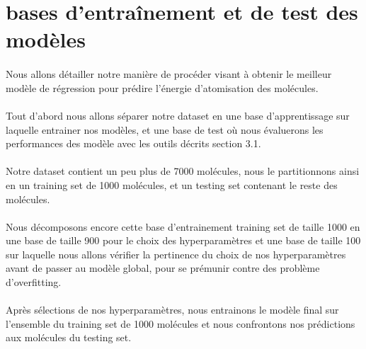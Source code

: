 \documentclass[a4paper,12pt,titlepage]{report}
\begin{document}
\section{bases d'entraînement et de test des modèles}

\paragraph{}
Nous allons détailler notre manière de procéder visant à obtenir le meilleur modèle de régression pour prédire l'énergie d'atomisation des molécules.

\paragraph{}
Tout d'abord nous allons séparer notre dataset en une base d'apprentissage sur laquelle entrainer nos modèles, et une base de test où nous évaluerons les performances des modèle avec les outils décrits section 3.1. 
\paragraph{}
Notre dataset contient un peu plus de 7000 molécules, nous le partitionnons ainsi en un training set de 1000 molécules, et un testing set contenant le reste des molécules.
\paragraph{}
Nous décomposons encore cette base d'entrainement training set de taille 1000 en une base de taille 900 pour le choix des hyperparamètres et une base de taille 100 sur laquelle nous allons vérifier la pertinence du choix de nos hyperparamètres avant de passer au modèle global, pour se prémunir contre des problème d'overfitting.
\paragraph{}
Après sélections de nos hyperparamètres, nous entrainons le modèle final sur l'ensemble du training set de 1000 molécules et nous confrontons nos prédictions aux molécules du testing set.
\end{document}
